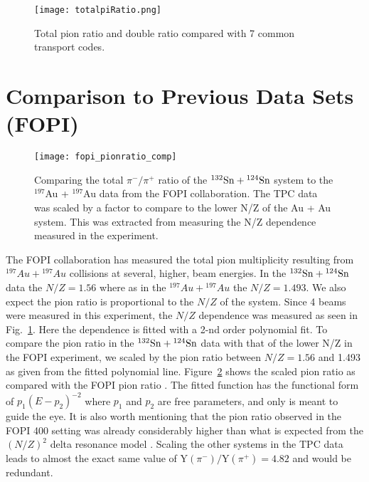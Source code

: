 \begin{figure}[!htb]
\centering
\texttt{[image: totalpiRatio.png]}
\caption{Total pion ratio and double ratio compared with 7 common transport codes.}
\label{fig:totalpiRatio}
\end{figure}




\section{Comparison to Previous Data Sets (FOPI)}


\begin{figure}[!htb]
\centering
\texttt{[image: fopi\_pionratio\_comp]}
\caption{Comparing the total $\pi^-/\pi^+$ ratio of the ${}^{132}\mathrm{Sn} + {}^{124}\mathrm{Sn}$ system to the ${}^{197}$Au + ${}^{197}$Au data from the FOPI collaboration. The \spirit TPC data was scaled by a factor to compare to the lower N/Z of the Au + Au system. This was extracted from measuring the N/Z dependence measured in the experiment. }
\label{fig:fopiPionRatio}
\end{figure}

The FOPI collaboration has measured the total pion multiplicity resulting from ${}^{197}Au + {}^{197}Au$ collisions at several, higher, beam energies. In the ${}^{132}\mathrm{Sn} + {}^{124}\mathrm{Sn}$ data the $N/Z=1.56$ where as in the ${}^{197}Au + {}^{197}Au$ the $N/Z=1.493$. We also expect the pion ratio is proportional to the $N/Z$ of the system. Since 4 beams were measured in this experiment, the $N/Z$ dependence was measured as seen in Fig.~\ref{fig:totalpiRatio}. Here the dependence is fitted with a 2-nd order polynomial fit. To compare the pion ratio in the ${}^{132}\mathrm{Sn} + {}^{124}\mathrm{Sn}$ data with that of the lower N/Z in the FOPI experiment, we scaled by the pion ratio between $N/Z=1.56$ and 1.493 as given from the fitted polynomial line. Figure~\ref{fig:fopiPionRatio} shows the scaled pion ratio as compared with the FOPI pion ratio \cite{fopi}. The fitted function has the functional form of $p_1(E - p_2)^{-2}$ where $p_1$ and $p_2$ are free parameters, and only is meant to guide the eye. It is also worth mentioning that the pion ratio observed in the FOPI \SI{400}{\MeVA} setting was already considerably higher than what is expected from the $(N/Z)^2$ delta resonance model \cite{baoan_piprod1,baoan_piprod2}. Scaling the other systems in the \spirit TPC data leads to almost the exact same value of $\mathrm{Y}(\pi^-)/\mathrm{Y}(\pi^+) = \num{4.82}$ and would be redundant. 




